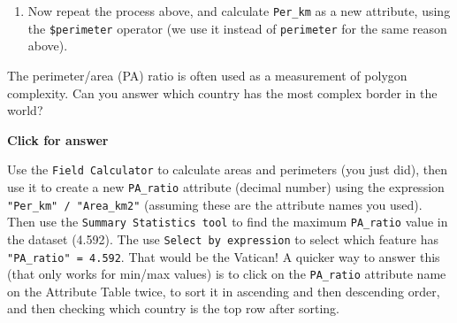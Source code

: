\documentclass[
  letterpaper,
  DIV=11,
  numbers=noendperiod]{scrreprt}
\providecommand{\tightlist}{%
  \setlength{\itemsep}{0pt}\setlength{\parskip}{0pt}}\usepackage{longtable,booktabs,array}
\begin{document}
\begin{enumerate}
\def\labelenumi{(\arabic{enumi})}
\setcounter{enumi}{120}
\tightlist
\item
  Now repeat the process above, and calculate \texttt{Per\_km} as a new
  attribute, using the \texttt{\$perimeter} operator (we use it instead
  of \texttt{perimeter} for the same reason above).
\end{enumerate}

\begin{tcolorbox}[enhanced jigsaw, breakable, toptitle=1mm, colback=white, left=2mm, leftrule=.75mm, titlerule=0mm, colframe=quarto-callout-important-color-frame, opacityback=0, title=\textcolor{quarto-callout-important-color}{\faExclamation}\hspace{0.5em}{Stop and Think}, toprule=.15mm, opacitybacktitle=0.6, bottomtitle=1mm, colbacktitle=quarto-callout-important-color!10!white, bottomrule=.15mm, coltitle=black, rightrule=.15mm, arc=.35mm]

The perimeter/area (PA) ratio is often used as a measurement of polygon
complexity. Can you answer which country has the most complex border in
the world?

\end{tcolorbox}

\begin{tcolorbox}[enhanced jigsaw, leftrule=.75mm, colframe=quarto-callout-important-color-frame, breakable, toprule=.15mm, bottomrule=.15mm, arc=.35mm, rightrule=.15mm, opacityback=0, colback=white, left=2mm]

\vspace{-3mm}\textbf{Click for answer}\vspace{3mm}

Use the \texttt{Field\ Calculator} to calculate areas and perimeters
(you just did), then use it to create a new \texttt{PA\_ratio} attribute
(decimal number) using the expression \texttt{"Per\_km"\ /\ "Area\_km2"}
(assuming these are the attribute names you used). Then use the
\texttt{Summary\ Statistics\ tool} to find the maximum
\texttt{PA\_ratio} value in the dataset (4.592). The use
\texttt{Select\ by\ expression} to select which feature has
\texttt{"PA\_ratio"\ =\ 4.592}. That would be the Vatican! A quicker way
to answer this (that only works for min/max values) is to click on the
\texttt{PA\_ratio} attribute name on the Attribute Table twice, to sort
it in ascending and then descending order, and then checking which
country is the top row after sorting.

\end{tcolorbox}
\end{document}
